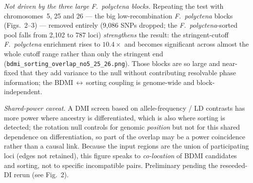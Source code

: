 \documentclass[11pt]{article}
\newcommand{\Fpo}{\textit{F.~polyctena}}
\begin{document}
{%
\emph{Not driven by the three large \Fpo{} blocks.} Repeating the test with chromosomes~5, 25
and 26 --- the big low-recombination \Fpo{} blocks (Figs.~2--3) --- removed entirely (9{,}086
SNPs dropped; the \Fpo{}-sorted pool falls from 2{,}102 to 787 loci) \emph{strengthens} the
result: the stringent-cutoff \Fpo{} enrichment rises to $10.4\times$ and becomes significant
across almost the whole cutoff range rather than only the stringent end
(\texttt{bdmi\_sorting\_overlap\_no5\_25\_26.png}). Those blocks are so large and near-fixed that
they add variance to the null without contributing resolvable phase information; the
BDMI\,$\leftrightarrow$\,sorting coupling is genome-wide and block-independent.

\emph{Shared-power caveat.} A DMI screen based on allele-frequency / LD contrasts has more power
where ancestry is differentiated, which is also where sorting is detected; the rotation null
controls for genomic \emph{position} but not for this shared dependence on differentiation, so
part of the overlap may be a power coincidence rather than a causal link. Because the input
regions are the union of participating loci (edges not retained), this figure speaks to
\emph{co-location} of BDMI candidates and sorting, not to specific incompatible pairs. Preliminary
pending the reseeded-DI rerun (see Fig.~2).}
\end{document}
